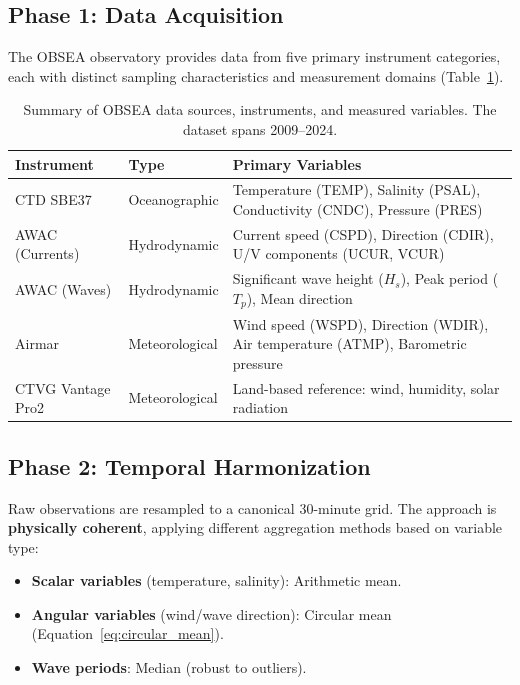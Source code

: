 \documentclass[12pt,a4paper]{article}
\begin{document}
\newpage
\subsection{Phase 1: Data Acquisition}
\label{sec:data_acquisition}

The OBSEA observatory provides data from five primary instrument categories, each with distinct sampling characteristics and measurement domains (Table~\ref{tab:data_sources}).

\begin{table}[H]
\centering
\caption{Summary of OBSEA data sources, instruments, and measured variables. The dataset spans 2009--2024.}
\label{tab:data_sources}
\begin{tabularx}{\textwidth}{@{}llX@{}}
\toprule
\textbf{Instrument} & \textbf{Type} & \textbf{Primary Variables} \\ \midrule
CTD SBE37 & Oceanographic & Temperature (TEMP), Salinity (PSAL), Conductivity (CNDC), Pressure (PRES) \\
AWAC (Currents) & Hydrodynamic & Current speed (CSPD), Direction (CDIR), U/V components (UCUR, VCUR) \\
AWAC (Waves) & Hydrodynamic & Significant wave height ($H_s$), Peak period ($T_p$), Mean direction \\
Airmar & Meteorological & Wind speed (WSPD), Direction (WDIR), Air temperature (ATMP), Barometric pressure \\
CTVG Vantage Pro2 & Meteorological & Land-based reference: wind, humidity, solar radiation \\
\bottomrule
\end{tabularx}
\end{table}

\subsection{Phase 2: Temporal Harmonization}
\label{sec:harmonization}

Raw observations are resampled to a canonical 30-minute grid. The approach is \textbf{physically coherent}, applying different aggregation methods based on variable type:

\begin{itemize}[noitemsep]
    \item \textbf{Scalar variables} (temperature, salinity): Arithmetic mean.
    \item \textbf{Angular variables} (wind/wave direction): Circular mean (Equation~\ref{eq:circular_mean}).
    \item \textbf{Wave periods}: Median (robust to outliers).
\end{itemize}
\end{document}
